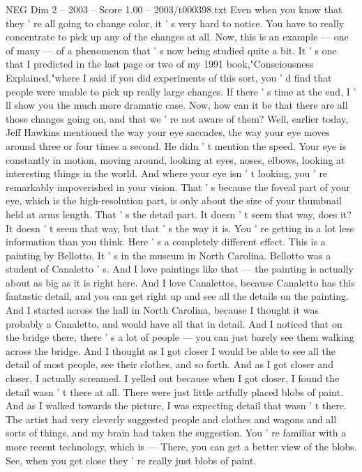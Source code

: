 \begin{textsample}{NEG Dim 2 – 2003 – Score 1.00 – 2003/t000398.txt}
Even when you know that they ' re all going to change color, it ' s very hard to notice.
You have to really concentrate to pick up any of the changes at all.
Now, this is an example — one of many — of a phenomenon that ' s now being studied quite a bit.
It ' s one that I predicted in the last page or two of my 1991 book,"Consciousness Explained,"where I said if you did experiments of this sort, you ' d find that people were unable to pick up really large changes.
If there ' s time at the end, I ' ll show you the much more dramatic case.
Now, how can it be that there are all those changes going on, and that we ' re not aware of them?
Well, earlier today, Jeff Hawkins mentioned the way your eye saccades, the way your eye moves around three or four times a second.
He didn ' t mention the speed.
Your eye is constantly in motion, moving around, looking at eyes, noses, elbows, looking at interesting things in the world.
And where your eye isn ' t looking, you ' re remarkably impoverished in your vision.
That ' s because the foveal part of your eye, which is the high-resolution part, is only about the size of your thumbnail held at arms length.
That ' s the detail part.
It doesn ' t seem that way, does it?
It doesn ' t seem that way, but that ' s the way it is.
You ' re getting in a lot less information than you think.
Here ' s a completely different effect.
This is a painting by Bellotto.
It ' s in the museum in North Carolina.
Bellotto was a student of Canaletto ' s.
And I love paintings like that — the painting is actually about as big as it is right here.
And I love Canalettos, because Canaletto has this fantastic detail, and you can get right up and see all the details on the painting.
And I started across the hall in North Carolina, because I thought it was probably a Canaletto, and would have all that in detail.
And I noticed that on the bridge there, there ' s a lot of people — you can just barely see them walking across the bridge.
And I thought as I got closer I would be able to see all the detail of most people, see their clothes, and so forth.
And as I got closer and closer, I actually screamed.
I yelled out because when I got closer, I found the detail wasn ' t there at all.
There were just little artfully placed blobs of paint.
And as I walked towards the picture, I was expecting detail that wasn ' t there.
The artist had very cleverly suggested people and clothes and wagons and all sorts of things, and my brain had taken the suggestion.
You ' re familiar with a more recent technology, which is — There, you can get a better view of the blobs.
See, when you get close they ' re really just blobs of paint.

\end{textsample}
